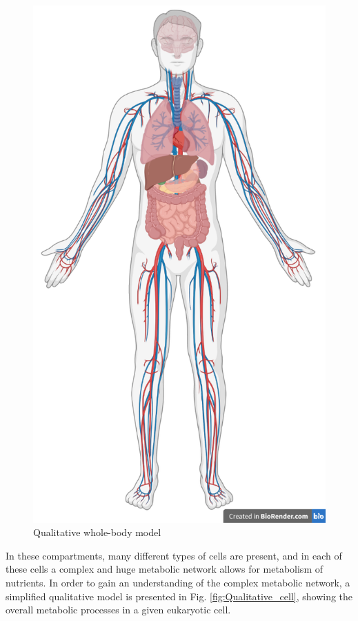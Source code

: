 \documentclass{IEEEtran}
\begin{document}
\begin{figure}[H]
    \centering
    \includegraphics[width=0.8\columnwidth]{Diagrams/Qualitative whole body.png}
    \caption{Qualitative whole-body model}
    \label{fig:whole-body}
\end{figure}




In these compartments, many different types of cells are present, and in each of these cells a complex and huge metabolic network allows for metabolism of nutrients. In order to gain an understanding of the complex metabolic network, a simplified qualitative model is presented in Fig. \ref{fig:Qualitative_cell}, showing the overall metabolic processes in a given eukaryotic cell.
\end{document}
